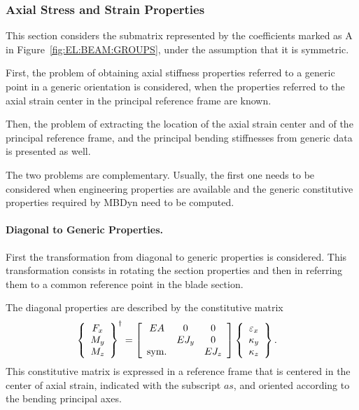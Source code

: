 \subsubsection{Axial Stress and Strain Properties}
This section considers the submatrix represented by the coefficients 
marked as A in Figure~\ref{fig:EL:BEAM:GROUPS}, under the assumption 
that it is symmetric.

First, the problem of obtaining axial stiffness properties referred
to a generic point in a generic orientation is considered,
when the properties referred to the axial strain center
in the principal reference frame are known.

Then, the problem of extracting the location of the axial strain center
and of the principal reference frame, and the principal bending stiffnesses
from generic data is presented as well.

The two problems are complementary.
Usually, the first one needs to be considered when engineering properties
are available and the generic constitutive properties required by MBDyn
need to be computed.

\paragraph{Diagonal to Generic Properties.}
First the transformation from diagonal to generic properties
is considered.
This transformation consists in rotating the section properties
and then in referring them to a common reference point in the blade section.

The diagonal properties are described by the constitutive matrix
\begin{align}
	\cubr{\cvvect{
		F_x \\
		M_y \\
		M_z
	}}^{\dagger}
	&=
	\sqbr{\matr{ccc}{
		EA & 0 & 0 \\
		& EJ_y & 0 \\
		\text{sym.} & & EJ_z
	}} \cubr{\cvvect{
		\varepsilon_x \\
		\kappa_y \\
		\kappa_z
	}} .
\end{align}
This constitutive matrix is expressed in a reference frame that is centered
in the center of axial strain, indicated with the subscript $as$,
and oriented according to the bending principal axes.

